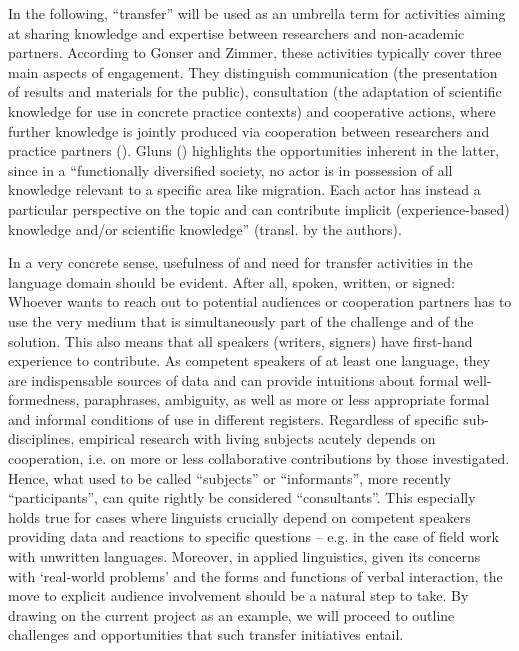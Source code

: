 \documentclass[output=paper,colorlinks,citecolor=brown]{langscibook}
\begin{document}
In the following, “transfer” will be used as an umbrella term for activities aiming at sharing knowledge and expertise between researchers and non-academic partners. According to Gonser and Zimmer, these activities typically cover three main aspects of engagement. They distinguish communication (the presentation of results and materials for the public), consultation (the adaptation of scientific knowledge for use in concrete practice contexts) and cooperative actions, where further knowledge is jointly produced via cooperation between researchers and practice partners (\cite[19]{Gonser&Zimmer2020}). Gluns (\citeyear[249]{Gluns2020}) highlights the opportunities inherent in the latter, since in a “functionally diversified society, no actor is in possession of all knowledge relevant to a specific area like migration. Each actor has instead a particular perspective on the topic and can contribute implicit (experience-based) knowledge and/or scientific knowledge” (transl. by the authors).
\largerpage

In a very concrete sense, usefulness of and need for transfer activities in the language domain should be evident. After all, spoken, written, or signed: Whoever wants to reach out to potential audiences or cooperation partners has to use the very medium that is simultaneously part of the challenge and of the solution. This also means that all speakers (writers, signers) have first-hand experience to contribute. As competent speakers of at least one language, they are indispensable sources of data and can provide intuitions about formal well-formedness, paraphrases, ambiguity, as well as more or less appropriate formal and informal conditions of use in different registers. Regardless of specific sub-disciplines, empirical research with living subjects acutely depends on cooperation, i.e. on more or less collaborative contributions by those investigated. Hence, what used to be called ``subjects'' or “informants”, more recently “participants”, can quite rightly be considered “consultants”. This especially holds true for cases where linguists crucially depend on competent speakers providing data and reactions to specific questions – e.g. in the case of field work with unwritten languages. Moreover, in applied linguistics, given its concerns with ‘real-world problems’ and the forms and functions of verbal interaction, the move to explicit audience involvement should be a natural step to take. By drawing on the current project as an example, we will proceed to outline challenges and opportunities that such transfer initiatives entail.
\end{document}
